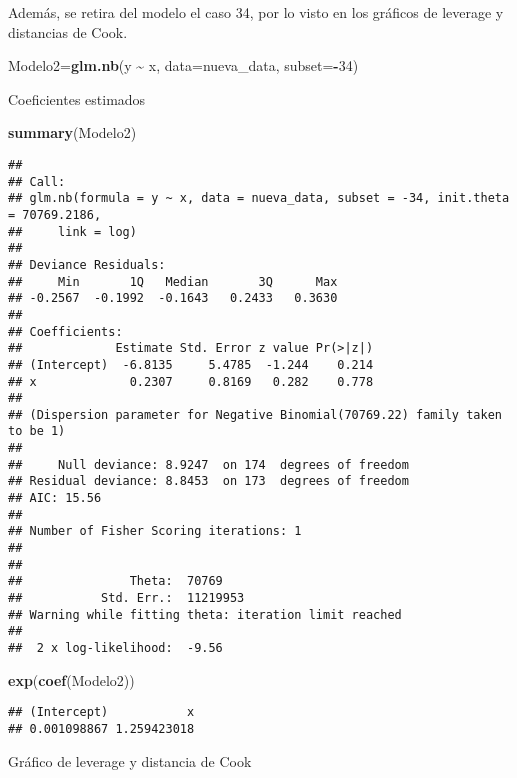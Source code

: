 \documentclass[]{article}
\newenvironment{Shaded}{\begin{snugshade}}{\end{snugshade}}
\newcommand{\DataTypeTok}[1]{\textcolor[rgb]{0.13,0.29,0.53}{#1}}
\newcommand{\DecValTok}[1]{\textcolor[rgb]{0.00,0.00,0.81}{#1}}
\newcommand{\KeywordTok}[1]{\textcolor[rgb]{0.13,0.29,0.53}{\textbf{#1}}}
\newcommand{\NormalTok}[1]{#1}
\newcommand{\OperatorTok}[1]{\textcolor[rgb]{0.81,0.36,0.00}{\textbf{#1}}}
\newcommand{\StringTok}[1]{\textcolor[rgb]{0.31,0.60,0.02}{#1}}
\begin{document}
Además, se retira del modelo el caso 34, por lo visto en los gráficos de
leverage y distancias de Cook.

\begin{Shaded}
\begin{Highlighting}[]
\NormalTok{Modelo2=}\KeywordTok{glm.nb}\NormalTok{(y }\OperatorTok{\textasciitilde{}}\StringTok{ }\NormalTok{x, }\DataTypeTok{data=}\NormalTok{nueva\_data, }\DataTypeTok{subset=}\OperatorTok{{-}}\DecValTok{34}\NormalTok{)}
\end{Highlighting}
\end{Shaded}

Coeficientes estimados

\begin{Shaded}
\begin{Highlighting}[]
\KeywordTok{summary}\NormalTok{(Modelo2)                  }
\end{Highlighting}
\end{Shaded}

\begin{verbatim}
## 
## Call:
## glm.nb(formula = y ~ x, data = nueva_data, subset = -34, init.theta = 70769.2186, 
##     link = log)
## 
## Deviance Residuals: 
##     Min       1Q   Median       3Q      Max  
## -0.2567  -0.1992  -0.1643   0.2433   0.3630  
## 
## Coefficients:
##             Estimate Std. Error z value Pr(>|z|)
## (Intercept)  -6.8135     5.4785  -1.244    0.214
## x             0.2307     0.8169   0.282    0.778
## 
## (Dispersion parameter for Negative Binomial(70769.22) family taken to be 1)
## 
##     Null deviance: 8.9247  on 174  degrees of freedom
## Residual deviance: 8.8453  on 173  degrees of freedom
## AIC: 15.56
## 
## Number of Fisher Scoring iterations: 1
## 
## 
##               Theta:  70769 
##           Std. Err.:  11219953 
## Warning while fitting theta: iteration limit reached 
## 
##  2 x log-likelihood:  -9.56
\end{verbatim}

\begin{Shaded}
\begin{Highlighting}[]
\KeywordTok{exp}\NormalTok{(}\KeywordTok{coef}\NormalTok{(Modelo2))}
\end{Highlighting}
\end{Shaded}

\begin{verbatim}
## (Intercept)           x 
## 0.001098867 1.259423018
\end{verbatim}

Gráfico de leverage y distancia de Cook
\end{document}

